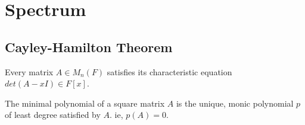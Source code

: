 \chapter{Spectrum}
\section{Cayley-Hamilton Theorem}
\begin{theorem}
	Every matrix $A \in M_n(F)$ satisfies its characteristic equation $det(A-xI) \in F[x]$.
\end{theorem}

\begin{definition}
	The minimal polynomial of a square matrix $A$ is the unique, monic polynomial $p$ of least degree satisfied by $A$. ie, $p(A) = 0$.
\end{definition}

